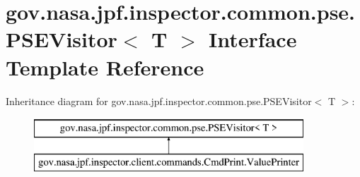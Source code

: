 \hypertarget{interfacegov_1_1nasa_1_1jpf_1_1inspector_1_1common_1_1pse_1_1_p_s_e_visitor}{}\section{gov.\+nasa.\+jpf.\+inspector.\+common.\+pse.\+P\+S\+E\+Visitor$<$ T $>$ Interface Template Reference}
\label{interfacegov_1_1nasa_1_1jpf_1_1inspector_1_1common_1_1pse_1_1_p_s_e_visitor}
Inheritance diagram for gov.\+nasa.\+jpf.\+inspector.\+common.\+pse.\+P\+S\+E\+Visitor$<$ T $>$\+:\begin{figure}[H]
\begin{center}
\leavevmode
\includegraphics[height=2.000000cm]{interfacegov_1_1nasa_1_1jpf_1_1inspector_1_1common_1_1pse_1_1_p_s_e_visitor}
\end{center}
\end{figure}

